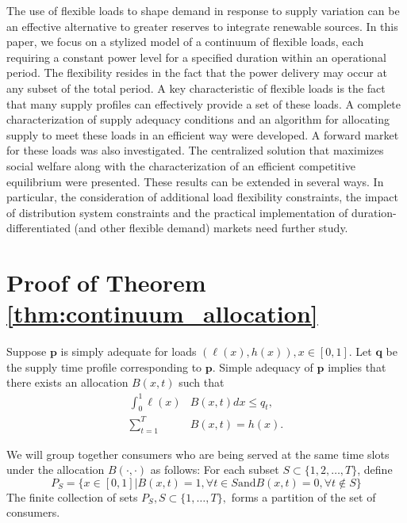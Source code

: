 \documentclass[10pt,draftcls,onecolumn]{IEEEtran}
\let \VEC \mathbf
\let \vec \mathbf
\newcounter{l1}
\newcounter{l2}
\newcounter{l3}
\begin{document}
The use of flexible loads to shape demand in response to supply variation can be an effective alternative to greater reserves to integrate renewable sources. In this paper, we focus on a stylized model of a continuum of flexible loads, each requiring a constant power level for a specified duration within an operational period. The flexibility resides in the fact that the power delivery may occur at any subset of the total period. 
A key characteristic of flexible loads is the fact that many supply profiles can effectively provide a set of these loads. A complete characterization of supply adequacy conditions and an algorithm for allocating supply to meet these loads in an efficient way were developed. 
A forward market for these loads was also investigated. The centralized solution that maximizes social welfare along with the characterization of an efficient competitive equilibrium were presented. These results can be extended in several ways. In particular, the consideration of additional load flexibility constraints, the impact of distribution system constraints and the practical implementation of duration-differentiated (and other flexible demand) markets need further study.












\appendix
\section{Proof of Theorem \ref{thm:continuum_allocation}} \label{sec:allocation_proof}

Suppose $\VEC p$ is simply adequate for  loads $(\ell(x),h(x)), x \in [0,1]$.
Let $\VEC q$ be the supply time profile corresponding to  $\VEC p$. Simple adequacy of $\vec p$ implies that there exists an allocation $B(x,t)$ such that 
\begin{align}
\int_0^1 \ell(x)&B(x,t)dx \leq  q_t ,\\
\sum_{t=1}^T &B(x,t) = h(x) .
\end{align}

We will group together consumers who are being served at the same time slots under the allocation $B(\cdot,\cdot)$ as follows: For each  subset $S \subset \{1,2,\ldots,T\}$, define
\begin{equation}
P_{S} = \{ x \in [0,1] | B(x,t)=1, \forall  t \in S  \mbox{and} B(x,t)=0, \forall t \notin S\}
\end{equation}
The finite collection of sets $P_S, S \subset \{1,\ldots,T\},$ forms a partition of the set of consumers.
\end{document}
